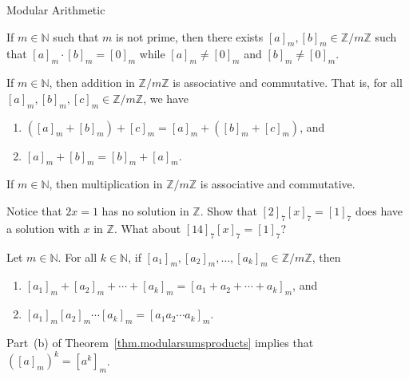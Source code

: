\begin{section}{Modular Arithmetic}
\begin{theorem}
If $m\in \mathbb{N}$ such that $m$ is not prime, then there exists $[a]_m, [b]_m \in \mathbb{Z}/m\mathbb{Z}$ such that $[a]_m\cdot[b]_m = [0]_m$ while $[a]_m \neq [0]_m$ and $[b]_m \neq [0]_m$.
\end{theorem}

\begin{theorem}
If $m\in \mathbb{N}$, then addition in $\mathbb{Z}/m\mathbb{Z}$ is associative and commutative. That is, for all $[a]_m, [b]_m, [c]_m \in \mathbb{Z}/m\mathbb{Z}$, we have
\begin{enumerate}[label=\textrm{(\alph*)}]
\item $([a]_m + [b]_m) + [c]_m = [a]_m + ([b]_m + [c]_m)$, and 
\item $[a]_m + [b]_m = [b]_m + [a]_m$.
\end{enumerate}
\end{theorem}

\begin{theorem}
If $m\in \mathbb{N}$, then multiplication in $\mathbb{Z}/m\mathbb{Z}$ is associative and commutative.
\end{theorem}

\begin{problem}
Notice that $2x = 1$ has no solution in $\mathbb{Z}$. Show that  $[2]_7[x]_7 = [1]_7$ does have a solution with $x$ in $\mathbb{Z}$. What about $[14]_7[x]_7 = [1]_7$?
\end{problem}

\begin{theorem}\label{thm.modularsumsproducts}
Let $m\in \mathbb{N}$.  For all $k\in \mathbb{N}$, if $[a_1]_m,[a_2]_m,\ldots, [a_k]_m \in \mathbb{Z}/m\mathbb{Z}$, then 
\begin{enumerate}[label=\textrm{(\alph*)}]
\item $[a_1]_m+[a_2]_m+\cdots+ [a_k]_m = [a_1 + a_2 +\cdots+ a_k]_m$, and
\item $[a_1]_m [a_2]_m \cdots  [a_k]_m = [a_1 a_2 \cdots a_k]_m$.
\end{enumerate}
\end{theorem}

\begin{remark}\label{rmk.modularpower}
Part~(b) of Theorem~\ref{thm.modularsumsproducts} implies that $([a]_m)^k = [a^k]_m$.
\end{remark}


\end{section}
